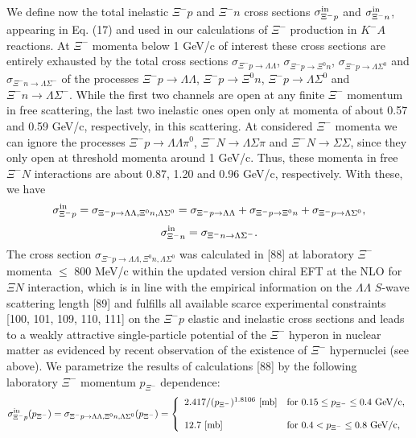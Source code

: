 \documentclass[12pt]{article}
\begin{document}
We define now the total inelastic $\Xi^-p$ and $\Xi^-n$ cross sections
$\sigma_{{\Xi^-}p}^{\rm in}$ and $\sigma_{{\Xi^-}n}^{\rm in}$,
appearing in Eq. (17) and used in our calculations of $\Xi^-$ production in $K^-A$ reactions.
At $\Xi^-$ momenta below 1 GeV/c of interest these cross sections are entirely exhausted by the
total cross sections $\sigma_{\Xi^-p \to {\Lambda}\Lambda}$, $\sigma_{\Xi^-p \to {\Xi^0}n}$,
$\sigma_{\Xi^-p \to {\Lambda}\Sigma^0}$ and $\sigma_{\Xi^-n \to {\Lambda}\Sigma^-}$ of the
processes $\Xi^-p \to {\Lambda}\Lambda$, $\Xi^-p \to {\Xi^0}n$, $\Xi^-p \to {\Lambda}\Sigma^0$ and
$\Xi^-n \to {\Lambda}\Sigma^-$. While the first two channels are open at any finite $\Xi^-$ momentum
in free scattering, the last two inelastic ones open only at momenta of about 0.57 and 0.59 GeV/c,
respectively, in this scattering. At considered $\Xi^-$ momenta we can ignore the processes
$\Xi^-p \to {\Lambda}\Lambda{\pi^0}$, $\Xi^-N \to {\Lambda}\Sigma{\pi}$ and $\Xi^-N \to {\Sigma}\Sigma$,
since they only open at threshold momenta around 1 GeV/c. Thus, these momenta in free $\Xi^-N$ interactions
are about 0.87, 1.20 and 0.96 GeV/c, respectively. With these, we have
\begin{equation}
\sigma_{{\Xi^-}p}^{\rm in}=\sigma_{\Xi^-p \to {\Lambda}\Lambda,{\Xi^0}n,\Lambda{\Sigma^0}}=
\sigma_{\Xi^-p \to {\Lambda}\Lambda}+\sigma_{\Xi^-p \to {\Xi^0}n}+\sigma_{\Xi^-p \to {\Lambda}\Sigma^0},
\end{equation}
\begin{equation}
\sigma_{{\Xi^-}n}^{\rm in}=\sigma_{\Xi^-n \to {\Lambda}\Sigma^-}.
\end{equation}
The cross section $\sigma_{\Xi^-p \to {\Lambda}\Lambda,{\Xi^0}n,\Lambda{\Sigma^0}}$ was calculated in
[88] at laboratory $\Xi^-$ momenta $\le$ 800 MeV/c within the updated version chiral EFT at the NLO for
${\Xi}N$ interaction, which is in line with the empirical information on the ${\Lambda}\Lambda$ $S$-wave
scattering length [89] and fulfills all available scarce experimental constraints [100, 101, 109, 110, 111]
on the ${\Xi^-}p$ elastic and inelastic
cross sections and leads to a weakly attractive single-particle potential of the $\Xi^-$ hyperon in
nuclear matter as evidenced by recent observation of the existence of $\Xi^-$ hypernuclei (see above).
We parametrize the results of calculations [88] by the following laboratory $\Xi^-$ momentum $p_{\Xi^-}$
dependence:
\begin{equation}
\sigma_{{\Xi^-}p}^{\rm in}(p_{\Xi^-})=
\sigma_{\Xi^-p \to {\Lambda}\Lambda,{\Xi^0}n,\Lambda{\Sigma^0}}(p_{\Xi^-})=\left\{
\begin{array}{ll}
	2.417/(p_{\Xi^-})^{1.8106}~[{\rm mb}]
	&\mbox{for $0.15 \le p_{\Xi^-} \le 0.4~{\rm GeV/c}$}, \\
	&\\
                   12.7~[{\rm mb}]
	&\mbox{for $0.4 < p_{\Xi^-} \le 0.8~{\rm GeV/c}$},
\end{array}
\right.	
\end{equation}
\end{document}
